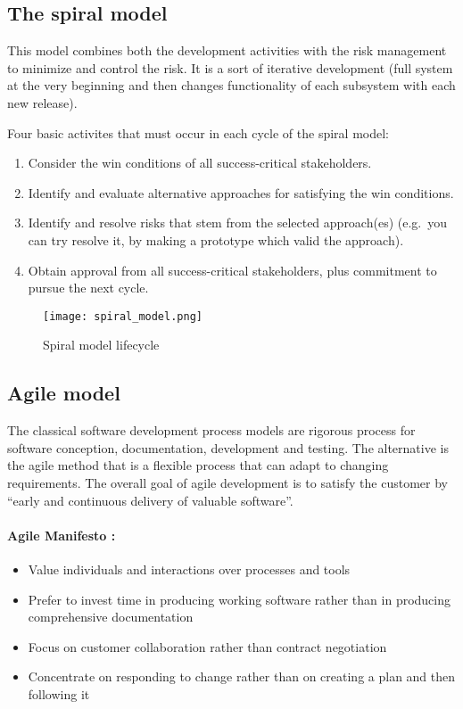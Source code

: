 \subsection{The spiral model}
This model combines both the development activities with the risk management to minimize and
control the risk. It is a sort of iterative development (full system at the very
beginning and then changes functionality of each subsystem with each new
release). \newline

Four basic activites that must occur in each cycle of the spiral model:

\begin{enumerate}
    \item Consider the win conditions of all success-critical stakeholders.
    \item Identify and evaluate alternative approaches for satisfying the win
    conditions.
    \item Identify and resolve risks that stem from the selected approach(es)
    (e.g.\ you can try resolve it, by making a prototype which valid the
    approach).
    \item Obtain approval from all success-critical stakeholders, plus
    commitment to pursue the next cycle.
\end{enumerate}

\begin{figure}[!ht]
    \centering
    \texttt{[image: spiral\_model.png]}
    \caption{Spiral model lifecycle}
\end{figure}
\FloatBarrier{}

\subsection{Agile model}
The classical software development process models are rigorous process for
software conception, documentation, development and testing. The alternative is the agile method that is a flexible process that can adapt to changing requirements. The overall goal of agile development is to satisfy the customer by \enquote{early and continuous delivery of valuable software}.

\paragraph{Agile Manifesto :\\}

\begin{itemize}
    \item Value individuals and interactions over processes and tools
    \item Prefer to invest time in producing working software rather than in producing comprehensive documentation
    \item Focus on customer collaboration rather than contract negotiation
    \item Concentrate on responding to change rather than on creating a plan and then following it
\end{itemize}


